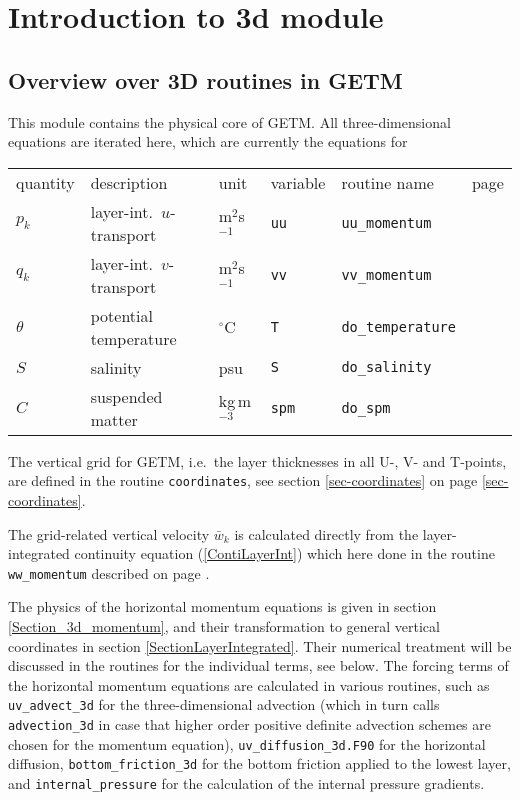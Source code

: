 
\section{Introduction to 3d module}

\subsection{Overview over 3D routines in GETM}
\label{Section_Overview_3D}


This module contains the physical core of GETM. All three-dimensional
equations are iterated here, which are currently the equations for

\vspace{0.5cm}

\begin{tabular}{llllll}
quantity & description & unit & variable & routine name & page \\
$p_k$    & layer-int.\ $u$-transport & m$^2$s$^{-1}$ & {\tt uu} & 
{\tt uu\_momentum} & \pageref{sec-uu-momentum-3d} \\
$q_k$    & layer-int.\ $v$-transport & m$^2$s$^{-1}$ & {\tt vv} & 
{\tt vv\_momentum} & \pageref{sec-vv-momentum-3d} \\
$\theta$    & potential temperature & $^{\circ}$C & {\tt T} & 
{\tt do\_temperature} & \pageref{sec-do-temperature} \\
$S$    & salinity & psu & {\tt S} & 
{\tt do\_salinity} & \pageref{sec-do-salinity} \\
$C$    & suspended matter & kg\,m$^{-3}$ & {\tt spm} & 
{\tt do\_spm} & \pageref{sec-do-spm} \\
\end{tabular}

\vspace{0.5cm}

The vertical grid for GETM, i.e.\ the layer thicknesses in all
U-, V- and T-points, are defined in the routine {\tt coordinates},
see section \ref{sec-coordinates} on page \ref{sec-coordinates}.

The grid-related vertical velocity $\bar w_k$ is calculated directly from 
the layer-integrated continuity equation (\ref{ContiLayerInt}) which here done
in the routine {\tt ww\_momentum} described on page \pageref{sec-ww-momentum-3d}.

The physics of the horizontal momentum equations is given in
section \ref{Section_3d_momentum}, and their transformation to general vertical
coordinates in section \ref{SectionLayerIntegrated}. Their numerical
treatment will be discussed in the routines for the individual terms, see
below.
The forcing terms of the horizontal momentum equations are calculated in 
various routines, such as {\tt uv\_advect\_3d} for the three-dimensional 
advection (which in turn calls 
{\tt advection\_3d} in case that higher order positive definite advection
schemes are chosen for the momentum equation), 
{\tt uv\_diffusion\_3d.F90} for the horizontal diffusion, 
{\tt bottom\_friction\_3d} for the bottom friction applied to the lowest
layer, and {\tt internal\_pressure} for the calculation of the internal
pressure gradients. 


